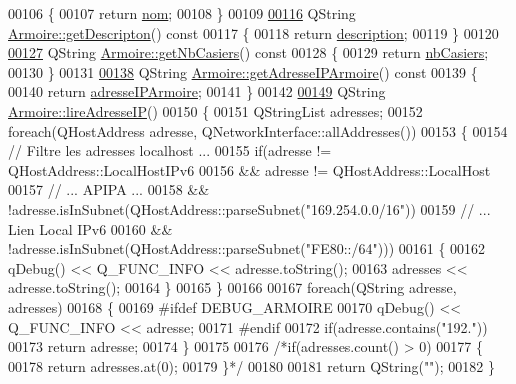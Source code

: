 \begin{DoxyCode}
00106 \textcolor{keyword}{}\{
00107     \textcolor{keywordflow}{return} \hyperlink{class_armoire_a1de028da0fa3f085e2feaad8311d8795}{nom};
00108 \}
00109 
\hyperlink{class_armoire_a19af26aa7dedd03202d2484744dcad76}{00116} QString \hyperlink{class_armoire_a19af26aa7dedd03202d2484744dcad76}{Armoire::getDescripton}()\textcolor{keyword}{ const}
00117 \textcolor{keyword}{}\{
00118     \textcolor{keywordflow}{return} \hyperlink{class_armoire_aa18be328693d7602439c779e30156c02}{description};
00119 \}
00120 
\hyperlink{class_armoire_aa94faaf53b6da5139a22a2ab21d4cf12}{00127} QString \hyperlink{class_armoire_aa94faaf53b6da5139a22a2ab21d4cf12}{Armoire::getNbCasiers}()\textcolor{keyword}{ const}
00128 \textcolor{keyword}{}\{
00129     \textcolor{keywordflow}{return} \hyperlink{class_armoire_a9c4e926b7cddb13d097b75b3f5ef3de8}{nbCasiers};
00130 \}
00131 
\hyperlink{class_armoire_a706def736570580d7e5e3d2e29321c66}{00138} QString \hyperlink{class_armoire_a706def736570580d7e5e3d2e29321c66}{Armoire::getAdresseIPArmoire}()\textcolor{keyword}{ const}
00139 \textcolor{keyword}{}\{
00140     \textcolor{keywordflow}{return} \hyperlink{class_armoire_ab96bd042aa78eaefba0aefb860684ca6}{adresseIPArmoire};
00141 \}
00142 
\hyperlink{class_armoire_abc30649cc7d4f3c0cefcc54894aeb406}{00149} QString \hyperlink{class_armoire_abc30649cc7d4f3c0cefcc54894aeb406}{Armoire::lireAdresseIP}()
00150 \{
00151     QStringList adresses;
00152     \textcolor{keywordflow}{foreach}(QHostAddress adresse, QNetworkInterface::allAddresses())
00153     \{
00154         \textcolor{comment}{// Filtre les adresses localhost ...}
00155         \textcolor{keywordflow}{if}(adresse != QHostAddress::LocalHostIPv6
00156            && adresse != QHostAddress::LocalHost
00157            \textcolor{comment}{// ... APIPA ...}
00158            && !adresse.isInSubnet(QHostAddress::parseSubnet(\textcolor{stringliteral}{"169.254.0.0/16"}))
00159            \textcolor{comment}{// ... Lien Local IPv6}
00160            && !adresse.isInSubnet(QHostAddress::parseSubnet(\textcolor{stringliteral}{"FE80::/64"})))
00161         \{
00162             qDebug() << Q\_FUNC\_INFO << adresse.toString();
00163             adresses << adresse.toString();
00164         \}
00165     \}
00166 
00167     \textcolor{keywordflow}{foreach}(QString adresse, adresses)
00168     \{
00169 \textcolor{preprocessor}{        #ifdef DEBUG\_ARMOIRE}
00170             qDebug() << Q\_FUNC\_INFO << adresse;
00171 \textcolor{preprocessor}{        #endif}
00172         \textcolor{keywordflow}{if}(adresse.contains(\textcolor{stringliteral}{"192."}))
00173             \textcolor{keywordflow}{return} adresse;
00174     \}
00175 
00176     \textcolor{comment}{/*if(adresses.count() > 0)}
00177 \textcolor{comment}{    \{}
00178 \textcolor{comment}{        return adresses.at(0);}
00179 \textcolor{comment}{    \}*/}
00180 
00181     \textcolor{keywordflow}{return} QString(\textcolor{stringliteral}{""});
00182 \}
\end{DoxyCode}
